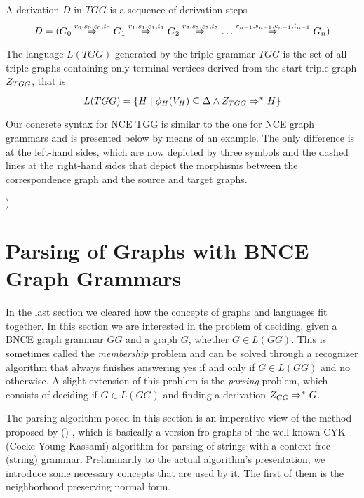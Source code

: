 \documentclass[]{report}
\begin{document}

\begin{definition}
	A derivation $D$ in $TGG$ is a sequence of derivation steps
	\[ 
	D = (G_0 \tderiv{r_0}{s_0,c_0,t_0}{} G_1 \tderiv{r_1}{s_1,c_1,t_1}{} G_2 \tderiv{r_2}{s_2,c_2,t_2}{} \dots \tderiv{r_{n-1}}{s_{n-1},c_{n-1},t_{n-1}}{} G_n)
	\]
\end{definition}

\begin{definition}
	\label{def:tlanguage}
	The language $L(TGG)$ generated by the triple grammar $TGG$ is the set of all triple graphs containing only terminal vertices derived from the start triple graph $Z_{TGG}$, that is
	\[
	L(TGG) = \{H \st \phi_H(V_H) \subseteq \Delta \land \startTG{TGG} \tderivtr{}{}{} H\}
	\]
\end{definition}

Our concrete syntax for NCE TGG is similar to the one for NCE graph grammars and is presented below by means of an example. The only difference is at the left-hand sides, which are now depicted by three symbols and the dashed lines at the right-hand sides that depict the morphisms between the correspondence graph and the source and target graphs.

) 

\section{Parsing of Graphs with BNCE Graph Grammars}
In the last section we cleared how the concepts of graphs and languages fit together. In this section we are interested in the problem of deciding, given a BNCE graph grammar $GG$ and a graph $G$, whether $G \in L(GG)$. This is sometimes called the \textit{membership} problem and can be solved through a recognizer algorithm that always finishes answering yes if and only if $G \in L(GG)$ and no otherwise. A slight extension of this problem is the \textit{parsing} problem, which consists of deciding if $G \in L(GG)$ and finding a derivation $\startG{GG} \derivtr{}{}{} G$.


The parsing algorithm posed in this section is an imperative view of the method proposed by ()%
, which is basically a version fro graphs of the well-known CYK (Cocke-Young-Kassami) algorithm for parsing of strings with a context-free (string) grammar. Preliminarily to the actual algorithm's presentation, we introduce some necessary concepts that are used by it. The first of them is the neighborhood preserving normal form.
\end{document}
